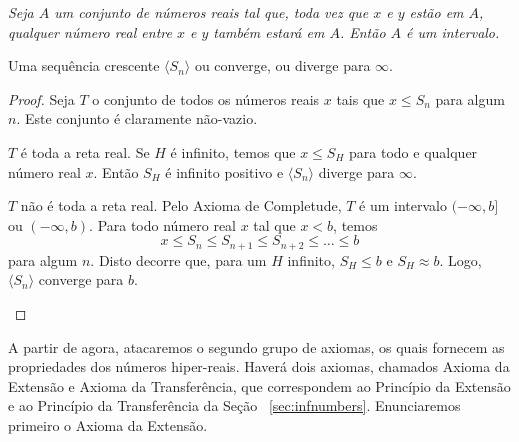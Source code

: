 
\emph{
Seja $A$ um conjunto de números reais tal que, toda vez que $x$ e $y$
estão em $A$, qualquer número real entre $x$ e $y$ também estará em $A$.
Então $A$ é um intervalo.
}

\begin{theor}
Uma sequência crescente $\langle S_n \rangle$ ou converge, ou diverge para
$\infty$.
\end{theor}

\begin{proof}
Seja $T$ o conjunto de todos os números reais $x$ tais que $x \le S_n$ para
algum $n$. Este conjunto é claramente não-vazio.

\begin{caseanalysis}
\item $T$ é toda a reta real. Se $H$ é infinito, temos que $x \le S_H$
para todo e qualquer número real $x$. Então $S_H$ é infinito positivo e
$\langle S_n \rangle$ diverge para $\infty$.

\item $T$ não é toda a reta real. Pelo Axioma de Completude,
$T$ é um intervalo $(-\infty, b]$ ou $(-\infty, b)$. Para todo número
real $x$ tal que $x < b$, temos
\[
	x \le S_n \le S_{n+1} \le S_{n+2} \le \ldots \le b
\]
para algum $n$. Disto decorre que, para um $H$ infinito, $S_H \le b$ e
$S_H \approx b$. Logo, $\langle S_n \rangle$ converge para $b$.
\end{caseanalysis}%
\end{proof}

A partir de agora, atacaremos o segundo grupo de axiomas, os quais
fornecem as propriedades dos números hiper-reais. Haverá dois axiomas,
chamados Axioma da Extensão e Axioma da Transferência, que correspondem
ao Princípio da Extensão e ao Princípio da Transferência da Seção%
~\ref{sec:infnumbers}. Enunciaremos primeiro o Axioma da Extensão.


